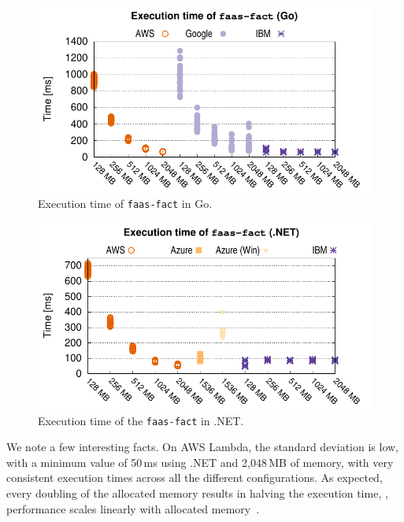 \begin{figure}[!b]
\centering
\includegraphics[scale=0.7]{bilder/general_go/cpufact.pdf}
\caption{Execution time of \texttt{faas-fact} in Go.}
\label{fig:general_go_plot}
\end{figure}

\begin{figure}[!b]
\centering
\includegraphics[scale=0.7]{bilder/general_dotnet/cpufact.pdf}
\caption{Execution time of the \texttt{faas-fact} in .NET.}
\label{fig:general_dotnet_plot}
\end{figure}

We note a few interesting facts.
On \gls{AWS} Lambda, the standard deviation is low, with a minimum value of 50\,ms using .NET and  2,048\,MB of memory, with very consistent execution times across all the different configurations. 
As expected, every doubling of the allocated memory results in halving the execution time, \ie, performance scales linearly with allocated memory~\cite{AWSLambdaConfig}. 

